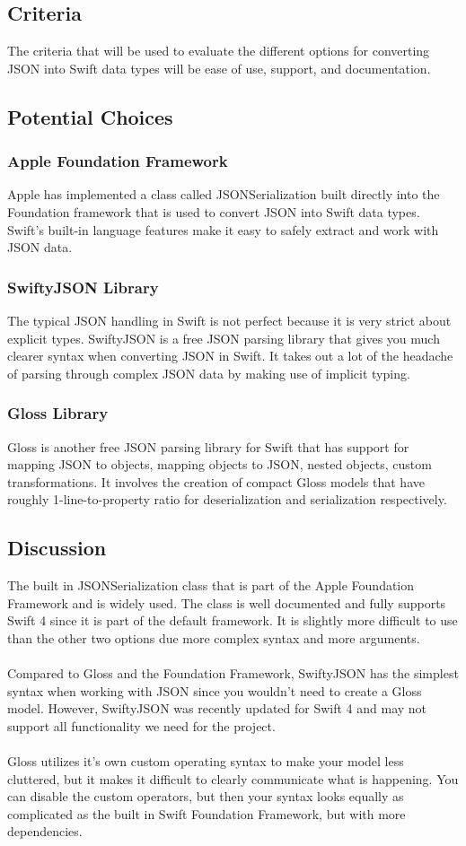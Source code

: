 \documentclass[onecolumn, draftclsnofoot,10pt, compsoc]{IEEEtran}
\begin{document}
\subsection{Criteria}
The criteria that will be used to evaluate the different options for converting JSON into Swift data types will be ease of use, support, and documentation. 
\subsection{Potential Choices}
\subsubsection{Apple Foundation Framework\cite{json}}
Apple has implemented a class called JSONSerialization built directly into the Foundation framework that is used to convert JSON into Swift data types.
Swift’s built-in language features make it easy to safely extract and work with JSON data.
\subsubsection{SwiftyJSON Library\cite{sjson}}
The typical JSON handling in Swift is not perfect because it is very strict about explicit types. 
SwiftyJSON is a free JSON parsing library that gives you much clearer syntax when converting JSON in Swift.
It takes out a lot of the headache of parsing through complex JSON data by making use of implicit typing.
\subsubsection{Gloss Library\cite{gloss}}
Gloss is another free JSON parsing library for Swift that has support for mapping JSON to objects, mapping objects to JSON, nested objects, custom transformations.
It involves the creation of compact Gloss models that have roughly 1-line-to-property ratio for deserialization and serialization respectively.
\subsection{Discussion}
The built in JSONSerialization class that is part of the Apple Foundation Framework and is widely used. 
The class is well documented and fully supports Swift 4 since it is part of the default framework. 
It is slightly more difficult to use than the other two options due more complex syntax and more arguments. \\ \\
\indent Compared to Gloss and the Foundation Framework, SwiftyJSON has the simplest syntax when working with JSON since you wouldn't need to create a Gloss model.  
However, SwiftyJSON was recently updated for Swift 4 and may not support all functionality we need for the project. \\ \\ 
\indent Gloss utilizes it's own custom operating syntax to make your model less cluttered, but it makes it difficult to clearly communicate what is happening.
You can disable the custom operators, but then your syntax looks equally as complicated as the built in Swift Foundation Framework, but with more dependencies.
\end{document}
